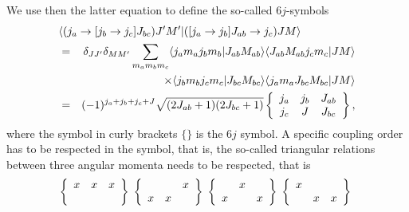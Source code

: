 \documentclass[graybox,sectrefs,envcountresetchap,open=right]{svmonodo}
\begin{document}
We use then the latter equation to define the so-called $6j$-symbols
\begin{eqnarray}
\nonumber
\lefteqn{ \langle (j_a\rightarrow [j_b\rightarrow j_c]J_{bc}) J'M'| ([j_a\rightarrow j_b]J_{ab}\rightarrow j_c) JM\rangle } \\ \nonumber
&= & \delta_{JJ'}\delta_{MM'}\sum_{m_am_bm_c}\langle j_am_aj_bm_b|J_{ab}M_{ab}\rangle \langle J_{ab}M_{ab}j_cm_c|JM\rangle \\ \nonumber
& &  \times \langle j_bm_bj_cm_c|J_{bc}M_{bc}\rangle \langle j_am_aJ_{bc}M_{bc}|JM\rangle  \\ \nonumber
&= & (-1)^{j_a+j_b+j_c+J}\sqrt{(2J_{ab}+1)(2J_{bc}+1)}\left\{\begin{array}{ccc} j_a & j_b& J_{ab} \\ j_c & J & J_{bc} \end{array}\right\}
, \nonumber
\end{eqnarray}
where the symbol in curly brackets $\{\}$ is the $6j$ symbol. 
A specific coupling order has to be respected in the symbol, that is, the so-called triangular relations between three angular momenta needs to be respected, that is 
\[
\left\{\begin{array}{ccc} x & x& x \\  &  &  \end{array}\right\}\hspace{0.1cm}\left\{\begin{array}{ccc}  & & x \\  x& x &  \end{array}\right\}\hspace{0.1cm}\left\{\begin{array}{ccc}  & x&  \\ x &  &x  \end{array}\right\}\hspace{0.1cm}\left\{\begin{array}{ccc} x & &  \\  & x &x  \end{array}\right\}\hspace{0.1cm}
\]
\end{document}
